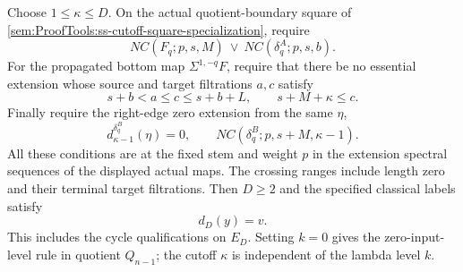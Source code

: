 \begin{corollary}
Choose $1\le\kappa\le D$. On the actual quotient-boundary square
of \ref{sem:ProofTools:ss-cutoff-square-specialization}, require
\[
NC(F_q;p,s,M)\ \lor\ NC(\delta_q^A;p,s,b).
\]
For the propagated bottom map $\Sigma^{1,-q}F$, require that there
be no essential extension whose source and target filtrations
$a,c$ satisfy
\[
s+b<a\le c\le s+b+L,\qquad s+M+\kappa\le c.
\]
Finally require the right-edge zero extension from the same $\eta$,
\[
d_{\kappa-1}^{\delta_q^B}(\eta)=0,\qquad
NC(\delta_q^B;p,s+M,\kappa-1).
\]
All these conditions are at the fixed stem and weight $p$ in the
extension spectral sequences of the displayed actual maps. The
crossing ranges include length zero and their terminal target
filtrations. Then $D\ge2$ and the specified classical labels satisfy
\[
d_D(y)=v.
\]
This includes the cycle qualifications on $E_D$.
Setting $k=0$ gives the zero-input-level rule in quotient $Q_{n-1}$;
the cutoff $\kappa$ is independent of the lambda level $k$.
\end{corollary}
